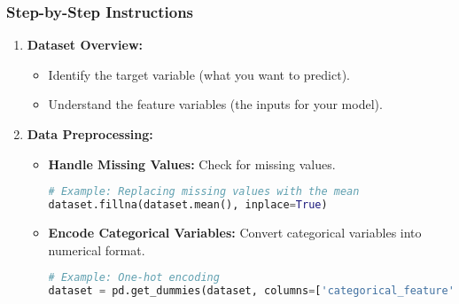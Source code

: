 \documentclass[aspectratio=169]{beamer}
\begin{document}
\begin{frame}[fragile]
    \frametitle{Step-by-Step Instructions}
    \begin{enumerate}
        \item \textbf{Dataset Overview:}
            \begin{itemize}
                \item Identify the target variable (what you want to predict).
                \item Understand the feature variables (the inputs for your model).
            \end{itemize}

        \item \textbf{Data Preprocessing:}
            \begin{itemize}
                \item \textbf{Handle Missing Values:} Check for missing values.
                \begin{lstlisting}[language=Python]
# Example: Replacing missing values with the mean
dataset.fillna(dataset.mean(), inplace=True)
                \end{lstlisting}
                \item \textbf{Encode Categorical Variables:} Convert categorical variables into numerical format.
                \begin{lstlisting}[language=Python]
# Example: One-hot encoding
dataset = pd.get_dummies(dataset, columns=['categorical_feature'])
                \end{lstlisting}
            \end{itemize}
    \end{enumerate}
\end{frame}
\end{document}
